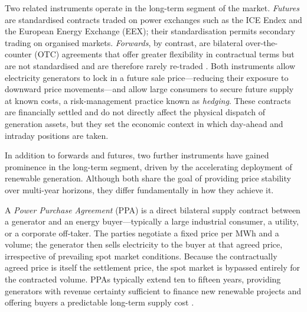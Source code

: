 Two related instruments operate in the long-term segment of the market. \textit{Futures} are standardised contracts traded on power exchanges such as the ICE Endex and the European Energy Exchange (EEX); their standardisation permits secondary trading on organised markets. \textit{Forwards}, by contrast, are bilateral over-the-counter (OTC) agreements that offer greater flexibility in contractual terms but are not standardised and are therefore rarely re-traded \cite{[search: electricity forward futures OTC bilateral contract standardised exchange ICE EEX]}. Both instruments allow electricity generators to lock in a future sale price—reducing their exposure to downward price movements—and allow large consumers to secure future supply at known costs, a risk-management practice known as \textit{hedging}. These contracts are financially settled and do not directly affect the physical dispatch of generation assets, but they set the economic context in which day-ahead and intraday positions are taken.

In addition to forwards and futures, two further instruments have gained prominence in the long-term segment, driven by the accelerating deployment of renewable generation. Although both share the goal of providing price stability over multi-year horizons, they differ fundamentally in how they achieve it.

A \textit{Power Purchase Agreement} (PPA) is a direct bilateral supply contract between a generator and an energy buyer---typically a large industrial consumer, a utility, or a corporate off-taker. The parties negotiate a fixed price per MWh and a volume; the generator then sells electricity to the buyer at that agreed price, irrespective of prevailing spot market conditions. Because the contractually agreed price is itself the settlement price, the spot market is bypassed entirely for the contracted volume. PPAs typically extend ten to fifteen years, providing generators with revenue certainty sufficient to finance new renewable projects and offering buyers a predictable long-term supply cost \cite{[search: Eurelectric power purchase agreement PPA renewable energy long-term contract bilateral]}.

